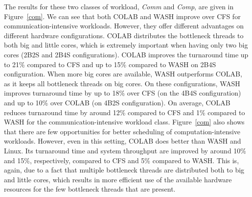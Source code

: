The results for these two classes of workload, \emph{Comm} and \emph{Comp}, are given in Figure~\ref{com}. We can see that both COLAB and WASH improve over CFS for communication-intensive workloads. However, they offer different advantages on different hardware configurations. COLAB distributes the bottleneck threads to both big and little cores, which is extremely important when having only two big cores (2B2S and 2B4S configurations). COLAB improves the turnaround time up to 21\% compared to CFS and up to 15\% compared to WASH on 2B4S configuration. When more big cores are available, WASH outperforms COLAB, as it keeps all bottleneck threads on big cores. On these configurations, WASH improves turnaround time by up to 18\% over CFS (on the 4B4S configuration) and up to 10\% over COLAB (on 4B2S configuration). On average, COLAB reduces turnaround time by around 12\% compared to CFS and 1\% compared to WASH for the communication-intensive workload class.
Figure~\ref{com} also shows that there are few opportunities for better scheduling of computation-intensive workloads. However, even in this setting, COLAB does better than WASH and Linux. Its turnaround time and system throughput are improved by around 10\% and 15\%, respectively, compared to CFS and 5\% compared to WASH. This is, again, due to a fact that multiple bottleneck threads are distributed both to big and little cores, which results in more efficient use of the available hardware resources for the few bottleneck threads that are present.  

